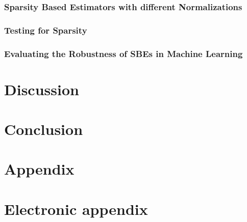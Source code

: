 \subsubsection{Sparsity Based Estimators with different Normalizations}

\subsubsection{Testing for Sparsity}

\subsubsection{Evaluating the Robustness of SBEs in Machine Learning}


\section{Discussion}



\section{Conclusion}
\label{conclusion}




\newpage

    

\setcounter{page}{5} %

\appendix

\section{Appendix}
\label{app}

\newpage

\section{Electronic appendix}
\label{el_app}


